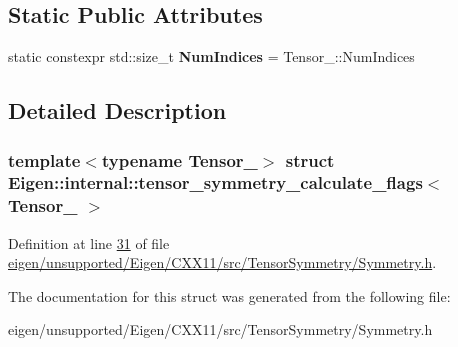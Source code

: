 \subsection*{Static Public Attributes}
\begin{DoxyCompactItemize}
\item 
\mbox{\label{struct_eigen_1_1internal_1_1tensor__symmetry__calculate__flags_a547bb87bca2a6842877dd57227ca3def}} 
static constexpr std\+::size\+\_\+t {\bfseries Num\+Indices} = Tensor\+\_\+\+::\+Num\+Indices
\end{DoxyCompactItemize}


\subsection{Detailed Description}
\subsubsection*{template$<$typename Tensor\+\_\+$>$\newline
struct Eigen\+::internal\+::tensor\+\_\+symmetry\+\_\+calculate\+\_\+flags$<$ Tensor\+\_\+ $>$}



Definition at line \hyperlink{eigen_2unsupported_2_eigen_2_c_x_x11_2src_2_tensor_symmetry_2_symmetry_8h_source_l00031}{31} of file \hyperlink{eigen_2unsupported_2_eigen_2_c_x_x11_2src_2_tensor_symmetry_2_symmetry_8h_source}{eigen/unsupported/\+Eigen/\+C\+X\+X11/src/\+Tensor\+Symmetry/\+Symmetry.\+h}.



The documentation for this struct was generated from the following file\+:\begin{DoxyCompactItemize}
\item 
eigen/unsupported/\+Eigen/\+C\+X\+X11/src/\+Tensor\+Symmetry/\+Symmetry.\+h\end{DoxyCompactItemize}
